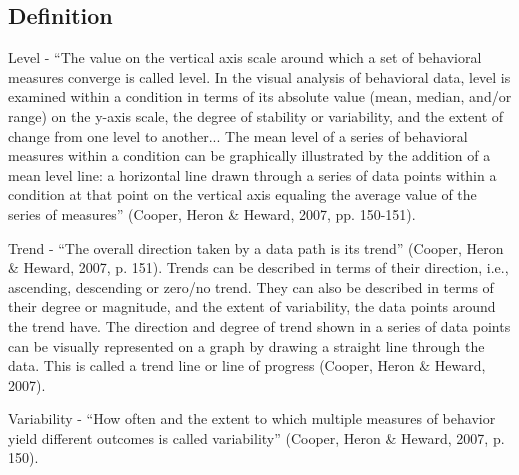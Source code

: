\subsection{Definition}
Level - ``The value on the vertical axis scale around which a set of behavioral measures converge is called level. In the visual analysis of behavioral data, level is examined within a condition in terms of its absolute value (mean, median, and/or range) on the y-axis scale, the degree of stability or variability, and the extent of change from one level to another... The mean level of a series of behavioral measures within a condition can be graphically illustrated by the addition of a mean level line: a horizontal line drawn through a series of data points within a condition at that point on the vertical axis equaling the average value of the series of measures'' (Cooper, Heron \& Heward, 2007, pp. 150-151). 

Trend - ``The overall direction taken by a data path is its trend'' (Cooper, Heron \& Heward, 2007, p. 151). Trends can be described in terms of their direction, i.e., ascending, descending or zero/no trend. They can also be described in terms of their degree or magnitude, and the extent of variability, the data points around the trend have. The direction and degree of trend shown in a series of data points can be visually represented on a graph by drawing a straight line through the data. This is called a trend line or line of progress (Cooper, Heron \& Heward, 2007).

Variability - ``How often and the extent to which multiple measures of behavior yield different outcomes is called variability'' (Cooper, Heron \& Heward, 2007, p. 150).
%
